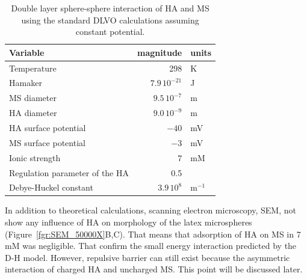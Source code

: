 \documentclass[journal=langd5,manuscript=article]{achemso}
\begin{document}
\begin{table}
\caption{Double layer sphere-sphere interaction  of HA and MS using the standard DLVO calculations assuming constant potential.}
\label{tbl:dvlo_interaction}
\begin{tabular}{lrl}
Variable & magnitude & units\\
\hline
Temperature & 298 & K\\
Hamaker & $7.9\,10^{-21}$ & J\cite{Fronczak2017}\\
MS  diameter & $9.5\, 10^{-7}$ & m\\
HA  diameter & $9.0\, 10^{-9}$ & m\\
HA surface potential & $-40$ & mV\cite{Rodrigues2009}\\
MS surface potential & $-3$ & mV\cite{Kotera1970}\\
Ionic strength & $7$ & mM \\
Regulation parameter of the HA & 0.5 \\
Debye-Huckel constant & $3.9\,10^8$ & $\mathrm{m^{-1}}$\\
\hline
\end{tabular}
\end{table}

In addition to theoretical calculations, scanning electron microscopy, SEM, not show any influence of HA on morphology of the latex microspheres
(Figure~\ref{fgr:SEM_50000X}B,C). That means that adsorption of HA on MS in 7 mM  was negligible. That confirm the 
small energy interaction predicted by the D-H model. However, repulsive barrier can still exist because the asymmetric interaction of charged HA and uncharged MS. This point will be discussed later.
\end{document}
